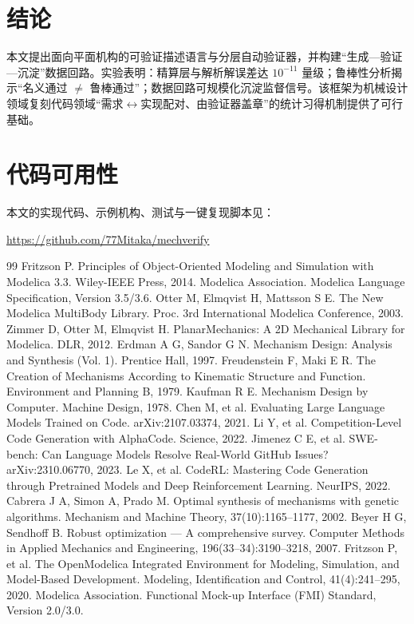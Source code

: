 \documentclass[UTF8,11pt,a4paper]{ctexart}
\begin{document}
\section{结论}
本文提出面向平面机构的可验证描述语言与分层自动验证器，并构建``生成—验证—沉淀''数据回路。实验表明：精算层与解析解误差达 $10^{-11}$ 量级；鲁棒性分析揭示``名义通过 $\neq$ 鲁棒通过''；数据回路可规模化沉淀监督信号。该框架为机械设计领域复刻代码领域``需求$\leftrightarrow$实现配对、由验证器盖章''的统计习得机制提供了可行基础。

\section*{代码可用性}
本文的实现代码、示例机构、测试与一键复现脚本见：
\begin{center}
\url{https://github.com/77Mitaka/mechverify}
\end{center}

\begin{thebibliography}{99}
 Fritzson P. Principles of Object-Oriented Modeling and Simulation with Modelica 3.3. Wiley-IEEE Press, 2014.
 Modelica Association. Modelica Language Specification, Version 3.5/3.6.
 Otter M, Elmqvist H, Mattsson S E. The New Modelica MultiBody Library. Proc. 3rd International Modelica Conference, 2003.
 Zimmer D, Otter M, Elmqvist H. PlanarMechanics: A 2D Mechanical Library for Modelica. DLR, 2012.
 Erdman A G, Sandor G N. Mechanism Design: Analysis and Synthesis (Vol. 1). Prentice Hall, 1997.
 Freudenstein F, Maki E R. The Creation of Mechanisms According to Kinematic Structure and Function. Environment and Planning B, 1979.
 Kaufman R E. Mechanism Design by Computer. Machine Design, 1978.
 Chen M, et al. Evaluating Large Language Models Trained on Code. arXiv:2107.03374, 2021.
 Li Y, et al. Competition-Level Code Generation with AlphaCode. Science, 2022.
 Jimenez C E, et al. SWE-bench: Can Language Models Resolve Real-World GitHub Issues? arXiv:2310.06770, 2023.
 Le X, et al. CodeRL: Mastering Code Generation through Pretrained Models and Deep Reinforcement Learning. NeurIPS, 2022.
 Cabrera J A, Simon A, Prado M. Optimal synthesis of mechanisms with genetic algorithms. Mechanism and Machine Theory, 37(10):1165--1177, 2002.
 Beyer H G, Sendhoff B. Robust optimization --- A comprehensive survey. Computer Methods in Applied Mechanics and Engineering, 196(33--34):3190--3218, 2007.
 Fritzson P, et al. The OpenModelica Integrated Environment for Modeling, Simulation, and Model-Based Development. Modeling, Identification and Control, 41(4):241--295, 2020.
 Modelica Association. Functional Mock-up Interface (FMI) Standard, Version 2.0/3.0.
\end{thebibliography}
\end{document}
